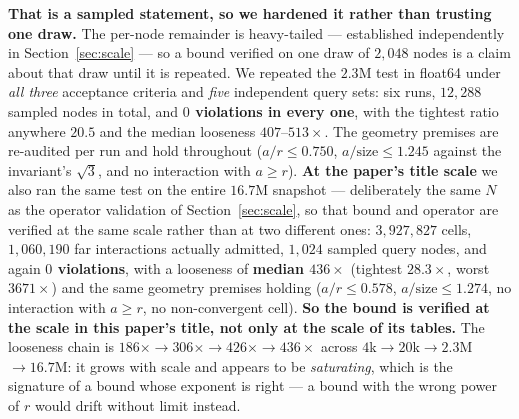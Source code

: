 \textbf{That is a sampled statement, so we hardened it rather than trusting one draw.} The per-node
remainder is heavy-tailed --- established independently in Section~\ref{sec:scale} --- so a bound
verified on one draw of $2{,}048$ nodes is a claim about that draw until it is repeated. We repeated
the $2.3$M test in float64 under \emph{all three} acceptance criteria and \emph{five} independent
query sets: six runs, $12{,}288$ sampled nodes in total, and \textbf{$0$ violations in every one},
with the tightest ratio anywhere $20.5$ and the median looseness $407$--$513\times$. The geometry
premises are re-audited per run and hold throughout ($a/r\le0.750$, $a/\text{size}\le1.245$ against
the invariant's $\sqrt3$, and no interaction with $a\ge r$). \textbf{At the paper's title scale} we also ran
the same test on the entire $16.7$M snapshot --- deliberately the same $N$ as the operator validation
of Section~\ref{sec:scale}, so that bound and operator are verified at the same scale rather than at
two different ones: $3{,}927{,}827$ cells, $1{,}060{,}190$ far interactions actually admitted, $1{,}024$
sampled query nodes, and again \textbf{$0$ violations}, with a looseness of
\textbf{median $436\times$} (tightest $28.3\times$, worst $3671\times$) and the same geometry premises
holding ($a/r\le0.578$, $a/\text{size}\le1.274$, no interaction with $a\ge r$, no non-convergent
cell). \textbf{So the bound is verified at the scale in this paper's title, not only at the scale of
its tables.} The looseness chain is $186\times\to306\times\to426\times\to436\times$ across
$4$k$\to20$k$\to2.3$M$\to16.7$M: it grows with scale and appears to be \emph{saturating}, which is the
signature of a bound whose exponent is right --- a bound with the wrong power of $r$ would drift
without limit instead.

